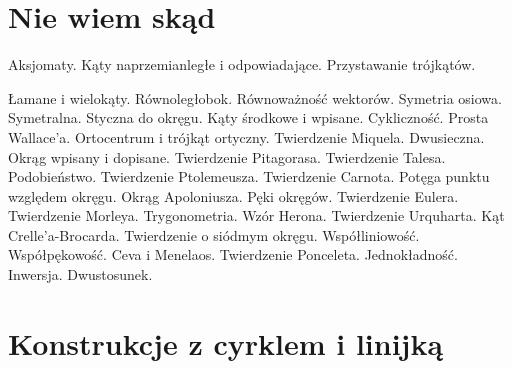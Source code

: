 \documentclass{parchment}
\begin{document}
\section{Nie wiem skąd}
Aksjomaty. Kąty naprzemianległe i odpowiadające.
Przystawanie trójkątów.


Łamane i wielokąty.
Równoległobok.
Równoważność wektorów.
Symetria osiowa.
Symetralna.
Styczna do okręgu.
Kąty środkowe i wpisane.
Cykliczność. Prosta Wallace'a.
Ortocentrum i trójkąt ortyczny.
Twierdzenie Miquela.
Dwusieczna. Okrąg wpisany i dopisane.
Twierdzenie Pitagorasa.
Twierdzenie Talesa.
Podobieństwo.
Twierdzenie Ptolemeusza.
Twierdzenie Carnota.
Potęga punktu względem okręgu.
Okrąg Apoloniusza.
Pęki okręgów.
Twierdzenie Eulera.
Twierdzenie Morleya.
Trygonometria. Wzór Herona.
Twierdzenie Urquharta.
Kąt Crelle'a-Brocarda.
Twierdzenie o siódmym okręgu.
Współliniowość.
Współpękowość.
Ceva i Menelaos.
Twierdzenie Ponceleta.
Jednokładność.
Inwersja.
Dwustosunek.

\section{Konstrukcje z cyrklem i linijką}











\end{document}
